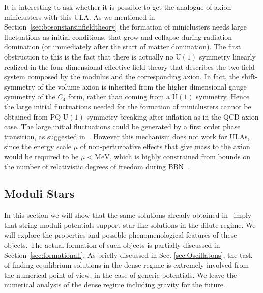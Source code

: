 \documentclass[11pt,a4paper]{article}
\begin{document}
It is interesting to ask whether it is possible to get the analogue of axion miniclusters with this ULA. As we mentioned in Section~\ref{sec:bosonstarsinfieldtheory} the formation of miniclusters needs large fluctuations as initial conditions, that grow and collapse during radiation domination (or immediately after the start of matter domination). The first obstruction to this is the fact that there is actually no U$(1)$ symmetry linearly realized in the four-dimensional effective field theory that describes the two-field system composed by the modulus and the corresponding axion. In fact, the shift-symmetry of the volume axion is inherited from the higher dimensional gauge symmetry of the $C_4$ form, rather than coming from a U$(1)$ symmetry. Hence the large initial fluctuations needed for the formation of miniclusters cannot be obtained from PQ U$(1)$ symmetry breaking after inflation as in the QCD axion case. The large initial fluctuations could be generated by  a first order phase transition, as suggested in~\cite{Hardy:2016mns}. However this mechanism does not work for ULAs, since the energy scale $\mu$ of non-perturbative effects that give mass to the axion would be required to be $\mu < \text{MeV}$, which is highly constrained from bounds on the number of relativistic degrees of freedom during BBN~\cite{Hardy:2016mns, Feng:2008mu}. 

\subsection{Moduli Stars}
\label{sec:ModuliStars}

In this section we will show that the same solutions already obtained in~\cite{Ruffini:1969qy, UrenaLopez:2001tw, UrenaLopez:2002gx, Alcubierre:2003sx, Guzman:2004wj, Visinelli:2017ooc} imply that string moduli potentials support star-like solutions in the dilute regime. We will explore the properties and possible phenomenological features of these objects. The actual formation of such objects is partially discussed in Section~\ref{sec:formationall}. As briefly discussed in Sec. \ref{sec:Oscillatons}, the task of finding equilibrium solutions in the dense regime is extremely involved from the numerical point of view, in the case of generic potentials. We leave the numerical analysis of the dense regime including gravity for the future.\\
\end{document}
